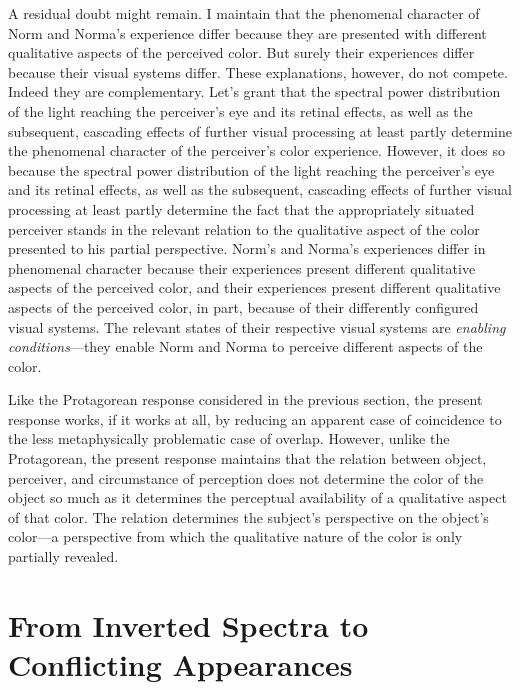 \documentclass[12pt]{article}
\begin{document}

A residual doubt might remain. I maintain that the phenomenal character of Norm and Norma's experience differ because they are presented with different qualitative aspects of the perceived color. But surely their experiences differ because their visual systems differ. These explanations, however, do not compete. Indeed they are complementary. Let's grant that the spectral power distribution of the light reaching the perceiver's eye and its retinal effects, as well as the subsequent, cascading effects of further visual processing at least partly determine the phenomenal character of the perceiver's color experience. However, it does so because the spectral power distribution of the light reaching the perceiver's eye and its retinal effects, as well as the subsequent, cascading effects of further visual processing at least partly determine the fact that the appropriately situated perceiver stands in the relevant relation to the qualitative aspect of the color presented to his partial perspective. Norm's and Norma's experiences differ in phenomenal character because their experiences present different qualitative aspects of the perceived color, and their experiences present different qualitative aspects of the perceived color, in part, because of their differently configured visual systems. The relevant states of their respective visual systems are \emph{enabling conditions}---they enable Norm and Norma to perceive different aspects of the color.

Like the Protagorean response considered in the previous section, the present response works, if it works at all, by reducing an apparent case of coincidence to the less metaphysically problematic case of overlap. However, unlike the Protagorean, the present response maintains that the relation between object, perceiver, and circumstance of perception does not determine the color of the object so much as it determines the perceptual availability of a qualitative aspect of that color. The relation determines the subject's perspective on the object's color---a perspective from which the qualitative nature of the color is only partially revealed.

\section{From Inverted Spectra to Conflicting Appearances}\label{sec:conclusion}
\end{document}
